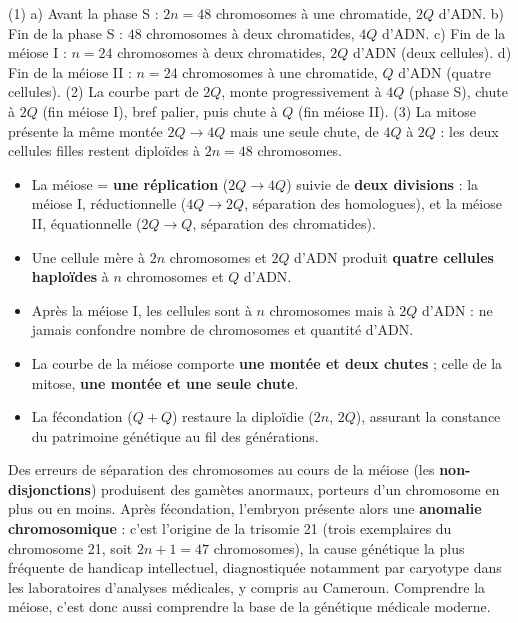 \documentclass[11pt]{article}
\begin{document}
\begin{corrige}
(1) a) Avant la phase S : $2n = 48$ chromosomes à une chromatide, $2Q$ d'ADN. b) Fin de la phase S : $48$ chromosomes à deux chromatides, $4Q$ d'ADN. c) Fin de la méiose I : $n = 24$ chromosomes à deux chromatides, $2Q$ d'ADN (deux cellules). d) Fin de la méiose II : $n = 24$ chromosomes à une chromatide, $Q$ d'ADN (quatre cellules). (2) La courbe part de $2Q$, monte progressivement à $4Q$ (phase S), chute à $2Q$ (fin méiose I), bref palier, puis chute à $Q$ (fin méiose II). (3) La mitose présente la même montée $2Q \rightarrow 4Q$ mais une seule chute, de $4Q$ à $2Q$ : les deux cellules filles restent diploïdes à $2n = 48$ chromosomes.
\end{corrige}

\begin{aretenir}
\begin{itemize}
\item La méiose = \textbf{une réplication} ($2Q \rightarrow 4Q$) suivie de \textbf{deux divisions} : la méiose I, réductionnelle ($4Q \rightarrow 2Q$, séparation des homologues), et la méiose II, équationnelle ($2Q \rightarrow Q$, séparation des chromatides).
\item Une cellule mère à $2n$ chromosomes et $2Q$ d'ADN produit \textbf{quatre cellules haploïdes} à $n$ chromosomes et $Q$ d'ADN.
\item Après la méiose I, les cellules sont à $n$ chromosomes mais à $2Q$ d'ADN : ne jamais confondre nombre de chromosomes et quantité d'ADN.
\item La courbe de la méiose comporte \textbf{une montée et deux chutes} ; celle de la mitose, \textbf{une montée et une seule chute}.
\item La fécondation ($Q + Q$) restaure la diploïdie ($2n$, $2Q$), assurant la constance du patrimoine génétique au fil des générations.
\end{itemize}
\end{aretenir}

\begin{savaistu}
Des erreurs de séparation des chromosomes au cours de la méiose (les \textbf{non-disjonctions}) produisent des gamètes anormaux, porteurs d'un chromosome en plus ou en moins. Après fécondation, l'embryon présente alors une \textbf{anomalie chromosomique} : c'est l'origine de la trisomie 21 (trois exemplaires du chromosome 21, soit $2n+1 = 47$ chromosomes), la cause génétique la plus fréquente de handicap intellectuel, diagnostiquée notamment par caryotype dans les laboratoires d'analyses médicales, y compris au Cameroun. Comprendre la méiose, c'est donc aussi comprendre la base de la génétique médicale moderne.
\end{savaistu}
\end{document}
